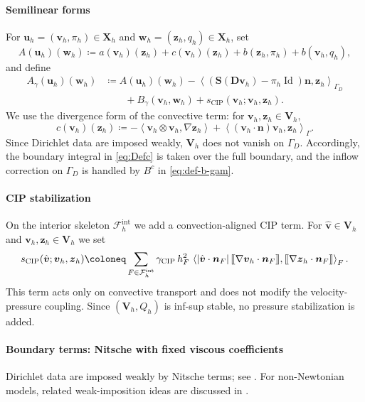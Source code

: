 \documentclass[DIV=16]{scrartcl}
\DeclareMathOperator{\Id}{Id}
\newcommand{\Ip}[2]{\left\langle #1,#2\right\rangle}
\newcommand{\abs}[1]{\left\lvert #1\right\rvert}
\newcommand{\uu}{\boldsymbol v}
\renewcommand{\vv}{\boldsymbol z}
\newcommand{\nn}{\boldsymbol n}
\newcommand{\GG}{\nabla}
\newcommand{\DD}{\boldsymbol D} %
\newcommand{\Sstress}{\boldsymbol S} %
\newcommand{\ljump}{\mathopen{[\mkern-2mu[}}
\newcommand{\rjump}{\mathclose{]\mkern-2mu]}}
\newcommand{\jump}[1]{\ljump #1 \rjump}
\newcommand{\Fhi}{\mathcal F_h^{\mathrm{int}}}
\newcommand{\GhD}{\Gamma_{D}}
\newcommand{\Vh}{\boldsymbol V_h}
\newcommand{\gCIP}{\gamma_{\mathrm{CIP}}}  %
\newcommand{\hF}{h_F}
\begin{document}
\paragraph{Semilinear forms}
For $\boldsymbol u_h=(\uu_h,\pi_h)\in\boldsymbol X_h$ and
$\boldsymbol w_h=(\vv_h,q_h)\in\boldsymbol X_h$, set
\begin{equation}
\label{eq:pns-form}
  A(\boldsymbol u_h)(\boldsymbol w_h)
  \coloneq
  a(\uu_h)(\vv_h)
  +c(\uu_h)(\vv_h)
  +b(\vv_h,\pi_h)+b(\uu_h,q_h),
\end{equation}
and define
\begin{equation}
\label{eq:def-a-gam}
\begin{split}
A_\gamma(\boldsymbol u_h)(\boldsymbol w_h)
&\coloneq
A(\boldsymbol u_h)(\boldsymbol w_h)
-\Ip{(\Sstress(\DD\uu_h)-\pi_h\Id)\nn}{\vv_h}_{\GhD}
\\
&\qquad
+ B_\gamma(\uu_h,\boldsymbol w_h)
+ s_{\mathrm{CIP}}(\uu_h;\uu_h,\vv_h).
\end{split}
\end{equation}
We use the divergence form of the convective term:
for $\uu_h,\vv_h\in\Vh$,
\begin{equation}
\label{eq:Defc}
  c(\uu_h)(\vv_h)
  \coloneq
  -\Ip{\uu_h\otimes \uu_h}{\GG \vv_h}
  +\Ip{(\uu_h\cdot\nn)\uu_h}{\vv_h}_{\Gamma}.
\end{equation}
Since Dirichlet data are imposed weakly, $\Vh$ does not vanish on $\GhD$.
Accordingly, the boundary integral in \eqref{eq:Defc} is taken over the full
boundary, and the inflow correction on $\GhD$ is handled by $B^c$ in
\eqref{eq:def-b-gam}.

\paragraph{CIP stabilization}
On the interior skeleton $\Fhi$ we add a convection-aligned CIP term.
For $\hat{\uu}\in\Vh$ and $\uu_h,\vv_h\in\Vh$ we set
\begin{equation}
\label{eq:scip-def}
  s_{\mathrm{CIP}}(\hat{\uu};\uu_h,\vv_h)
  \coloneq \sum_{F\in\Fhi} \gCIP\,\hF^2\,
  \Ip{\abs{\hat{\uu}\cdot\nn_F}\jump{\GG \uu_h\cdot\nn_F}}
     {\jump{\GG \vv_h\cdot\nn_F}}_F.
\end{equation}
This term acts only on convective transport and does not modify the
velocity-pressure coupling.
Since $(\Vh,Q_h)$ is inf-sup stable, no pressure stabilization is added.

\paragraph{Boundary terms: Nitsche with fixed viscous coefficients}
Dirichlet data are imposed weakly by Nitsche terms;
see \cite{Nitsche1971Dirichlet,JuntunenStenberg2009Nitsche}.
For non-Newtonian models, related weak-imposition ideas are discussed in
\cite{BaltussenEtAl2011WeakDirichletNonNewtonian}.
\end{document}
